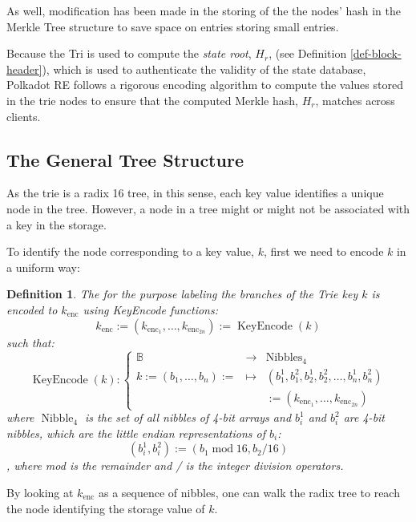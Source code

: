 \documentclass{article}
\newcommand{\assign}{:=}
\newcommand{\nosymbol}{}
\newcommand{\tmem}[1]{{\em #1\/}}
\newcommand{\tmop}[1]{\ensuremath{\operatorname{#1}}}
\newcommand{\tmtextit}[1]{{\itshape{#1}}}
\newtheorem{definition}{Definition}
\providecommand{\nosymbol}{}
\providecommand{\tmem}[1]{\tmtextit{#1}}
\providecommand{\tmop}[1]{\ensuremath{\mathrm{#1}}}
\providecommand{\tmtextit}[1]{\tmtextit{#1}}
\newtheorem{definition}{Definition}
\begin{document}
As well, modification has been made in the storing of the the nodes' hash in
the Merkle Tree structure to save space on entries storing small entries.

Because the Tri is used to compute the {\tmem{state root}}, $H_r$, (see
Definition \ref{def-block-header}), which is used to authenticate the validity
of the state database, Polkadot RE follows a rigorous encoding algorithm to
compute the values stored in the trie nodes to ensure that the computed Merkle
hash, $H_r$, matches across clients.

\subsection{The General Tree Structure}

As the trie is a radix 16 tree, in this sense, each key value identifies a
unique node in the tree. However, a node in a tree might or might not be
associated with a key in the storage.

To identify the node corresponding to a key value, $k$, first we need to
encode $k$ in a uniform way:

\begin{definition}
  The for the purpose labeling the branches of the Trie key $k$ is encoded to
  $k_{\tmop{enc}}$ using KeyEncode functions:
  \begin{equation}
    k_{\tmop{enc}} \assign (k_{\tmop{enc}_1}, \ldots, k_{\tmop{enc}_{2 n}})
    \assign \tmop{KeyEncode} (k) \label{key-encode-in-trie}
  \end{equation}
  such that:
  \[ \tmop{KeyEncode} (k) : \left\{ \begin{array}{lll}
       \mathbb{B}^{\nosymbol} & \rightarrow & \tmop{Nibbles}_4\\
       k \assign (b_1, \ldots, b_n) \assign & \mapsto & (b^1_1, b^2_1, b_2^1,
       b^2_2, \ldots, b^1_n, b^2_n)\\
       &  & \assign (k_{\tmop{enc}_1}, \ldots, k_{\tmop{enc}_{2 n}})
     \end{array} \right. \]
  where $\tmop{Nibble}_4$ is the set of all nibbles of 4-bit arrays and
  $b^1_i$ and $b^2_i$ are 4-bit nibbles, which are the little endian
  representations of $b_i$:
  \[ (b^1_i, b^2_i) \assign (b_1 \tmop{mod} 16, b_2 / 16) \]
  , where mod is the remainder and / is the integer division operators.
\end{definition}

By looking at $k_{\tmop{enc}}$ as a sequence of nibbles, one can walk the
radix tree to reach the node identifying the storage value of $k$.
\end{document}
